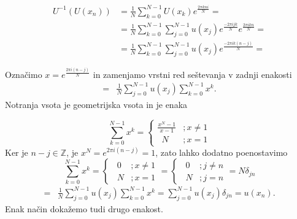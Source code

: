 \documentclass[mat2, tisk]{fmfdelo}
\newcommand{\Z}{\mathbb Z}
\begin{document}
\begin{dokaz}
\begin{align*}
  U^{-1}(U(x_n)) &= \frac{1}{N}\sum_{k=0}^{N-1} U(x_k) e^{\frac{2\pi k n i}{N}} = \\
  &= \frac{1}{N}\sum_{k=0}^{N-1} \sum_{j=0}^{N-1} u(x_j) e^{\frac{-2\pi i j k}{N}} e^{\frac{2\pi i k n }{N}} = \\
  &= \frac{1}{N}\sum_{k=0}^{N-1} \sum_{j=0}^{N-1} u(x_j) e^{\frac{-2\pi i k(n - j)}{N}} = 
\end{align*}

Označimo $x = e^{\frac{2\pi i (n-j)}{N}}$ in zamenjamo vrstni red seštevanja v 
zadnji enakosti 
\begin{align*}
=& \frac{1}{N}\sum_{j=0}^{N-1} u(x_j)\sum_{k=0}^{N-1} x^k .
\end{align*}
Notranja vsota je geometrijska vsota in je enaka

\[ 
  \sum_{k=0}^{N-1} x^k = \begin{cases} 
      \frac{x^N - 1}{x - 1} &; x\neq 1 \\
      \,\,\,N &; x = 1 
   \end{cases}
\]
Ker je $n-j \in \Z$, je $x^N = e^{2\pi i(n-j)} = 1$, zato lahko dodatno
poenostavimo  
\[ 
  \sum_{k=0}^{N-1} x^k = \begin{cases} 
      \,\,\,0 &; x\neq 1 \\
      \,\,\,N &; x = 1 
   \end{cases}
   = 
   \begin{cases} 
    \,\,\,0 &; j\neq n \\
    \,\,\,N &; j=n 
 \end{cases}
 = N\delta_{jn}
\]
\begin{align*}
  =& \frac{1}{N}\sum_{j=0}^{N-1} u(x_j)\sum_{k=0}^{N-1} x^k = \sum_{j=0}^{N-1} u(x_j) \delta_{jn} = u(x_n). 
\end{align*}
Enak način dokažemo tudi drugo enakost.
\end{dokaz}
\end{document}
